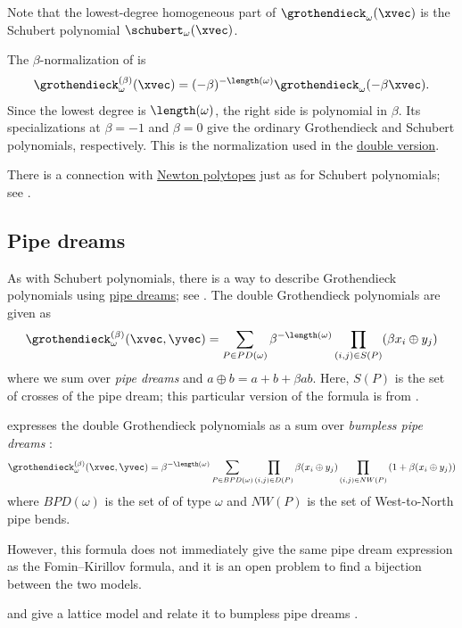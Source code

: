 Note that the lowest-degree homogeneous part of
$\grothendieck_\omega(\xvec)$ is the Schubert polynomial
$\schubert_\omega(\xvec)$.

The $\beta$-normalization of \cite{FominKirillov1994grothendieck} is
\[
 \grothendieck^{(\beta)}_\omega(\xvec)
 =(-\beta)^{-\length(\omega)}\grothendieck_\omega(-\beta\xvec).
\]
Since the lowest degree is $\length(\omega)$, the right side is polynomial
in $\beta$. Its specializations at $\beta=-1$ and $\beta=0$ give the
ordinary Grothendieck and Schubert polynomials, respectively. This is the
normalization used in the \hyperref[grothendieckDouble]{double version}.


There is a connection with \hyperref[newtonPolytope]{Newton polytopes} just as
for Schubert polynomials; see \cite{MeszarosDizier2017}.


\subsection[grothendieckPipedreams]{Pipe dreams}


As with Schubert polynomials, there is a way to describe
Grothendieck polynomials using \hyperref[schubertPipeDream]{pipe dreams};
see \cite{FominKirillov1994grothendieck,KnutsonMiller2004}.
The double Grothendieck polynomials are given as
\[
\grothendieck^{(\beta)}_\omega(\xvec,\yvec) =
\sum_{P \in PD(\omega)}
\beta^{-\length(\omega)}
\prod_{(i,j)\in S(P)} (\beta x_i \oplus y_j)
\]
where we sum over \emph{pipe dreams}
and $a \oplus b = a+b+\beta ab$.
Here, $S(P)$ is the set of crosses of the pipe dream; this particular version
of the formula is from \cite[Thm.~6.1]{Weigandt2021}.



 expresses the double Grothendieck polynomials
as a sum over \emph{bumpless pipe dreams} \cite[Thm.~1.1]{Weigandt2021}:
\[
\grothendieck^{(\beta)}_\omega(\xvec,\yvec) =
\beta^{-\length(\omega)}
\sum_{P \in BPD(\omega)}
\prod_{(i,j)\in D(P)} \beta (x_i \oplus y_j)
\prod_{(i,j)\in NW(P)} \left(1+ \beta (x_i \oplus y_j)\right)
\]
where $BPD(\omega)$ is the set of  of type $\omega$
and $NW(P)$ is the set of West-to-North pipe bends.

However, this formula does not immediately give the same pipe dream expression
as the Fomin--Kirillov formula, and it is an open problem
to find a bijection between the two models.

 and  give a lattice model and
relate it to bumpless pipe dreams \cite{BuciumasScrimshaw2020x}.


